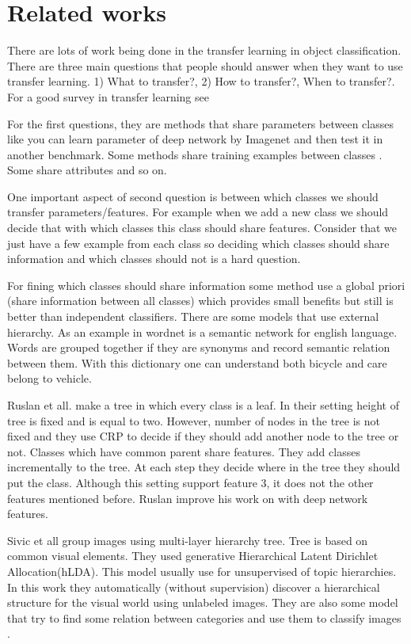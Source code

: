 \documentclass[10pt,twocolumn,letterpaper]{article}
\begin{document}
\section{Related works}

There are lots of work being done in the transfer learning in object classification. There are three main questions that people should answer when they want to use transfer learning. 1) What to transfer?,  2) How to transfer?, When to transfer?. For a good survey in transfer learning see \cite{transfersurvey}

For the first questions, they are methods that share parameters between classes like you can learn parameter of deep network \cite{deepnetwork} by Imagenet \cite{imagenet} and then test it in another benchmark. Some methods share training examples between classes \cite{semi}. Some share attributes \cite{attributes} and so on.

One important aspect of second question is between which classes we should transfer parameters/features. For example when we add a new class we should decide that with which classes this class should share features. Consider that we just have a few example from each class so deciding which classes should share information and which classes should not is a hard question.

For fining which classes should share information some method use a global priori \cite{priori} (share information between all classes) which provides small benefits but still is better than independent classifiers. There are some models \cite{semantic} that use external hierarchy. As an example in \cite{semantic} wordnet \cite{wordnet} is a semantic network for english language. Words are grouped together if they are synonyms and record semantic relation between them. With this dictionary one can understand both bicycle and care belong to vehicle.

Ruslan et all. \cite{ruslan}  make a tree in which every class is a leaf. In their setting height of tree is fixed and is equal to two. However, number of nodes in the tree is not fixed and they use CRP to decide if they should add another node to the tree or not. Classes which have common parent share features. They add classes incrementally to the tree. At each step they decide where in the tree they should put the class. Although this setting support feature 3, it does not the other features mentioned before. Ruslan improve his work on \cite{ruslan2} with deep network features.

Sivic et all \cite{sivic} group images using multi-layer hierarchy tree. Tree is based on common visual elements. They used generative Hierarchical Latent Dirichlet Allocation(hLDA). This model usually use for unsupervised of topic hierarchies. In this work they automatically (without supervision) discover a hierarchical structure for the visual world using unlabeled images. They are also some model that try to find some relation between categories and use them to classify images \cite{transfer22}.
\end{document}
